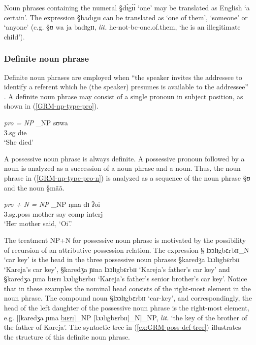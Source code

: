 Noun phrases  containing the
numeral {\S dɪ́gɪ́ɪ́} `one'  may be translated as
English `a certain'.    The
expression {\S badɪgɪɪ} can be translated as `one of them', `someone' or
`anyone'  (e.g. {\S ʊ wa ja badɪgɪɪ}, {\it lit.} he-not-be-one.of.them, `he is
an
illegitimate child'). 



\subsubsection{Definite noun phrase}
\label{sec:GRM-np-def}

Definite noun phrases are employed when ``the speaker invites the addressee to
identify a referent which he (the speaker) presumes is available to the
addressee'' \citep[184]{Dik97}. A definite noun phrase may consist of  a single
pronoun in subject position, as
shown in (\ref{GRM-np-type-pro}).

\begin{exe}
 \ex\label{GRM-np-type-pro}{\it pro = NP}
\gll  [ʊ]_{NP} sʊwa \\
      {\sc 3.sg} die\\
\glt  `She died'
\end{exe}


A possessive noun phrase is always definite. A possessive pronoun followed by a
noun is analyzed as a succession of a noun phrase and a noun. Thus,  the noun
phrase in (\ref{GRM-np-type-pro-n})  is analyzed as a sequence of the noun
phrase {\S ʊ} and the  noun  {\S mãã}. 


\begin{exe}

 \ex\label{GRM-np-type-pro-n}{\it pro + N = NP}
\gll   [ʊ mãã]_{NP} ŋma dɪ ʔoi \\
      {\sc 3.sg.poss} mother say  {\sc comp} {\sc interj}\\
\glt  `Her mother said, `Oi'.'
\end{exe}


The treatment  NP+N for possessive noun phrase is   motivated  by the
possibility of  recursion of  an attributive possession relation. The expression
{\S
lɔɔlɪgbɛrbɪɪ}_{N} `car 
key' is the head in the three possessive noun phrases   {\S karedʒa
lɔɔlɪgbɛrbɪɪ}
`Kareja's car key', {\S karedʒa ɲɪna lɔɔlɪgbɛrbɪɪ} `Kareja's father's car
 key' and {\S karedʒa ɲɪna bɪɛrɪ lɔɔlɪgbɛrbɪɪ}
`Kareja's father's senior brother's car  key'.  Notice that in these examples
  the nominal head consists of the right-most element in the noun phrase. The
compound noun  {\S  lɔɔlɪgbɛrbɪɪ}  `car-key', and correspondingly,
the head of the left daughter of the  possessive noun phrase is the right-most
element, e.g.   [[karedʒa ɲɪna \underline{bɪɛrɪ}]_{NP}
[lɔɔlɪgbɛrbɪɪ]_{N}]_{NP},
{\it lit.} `the key of the brother of the father of
Kareja'. The syntactic tree in (\ref{ex:GRM-poss-def-tree}) illustrates the
structure of this definite noun phrase.

